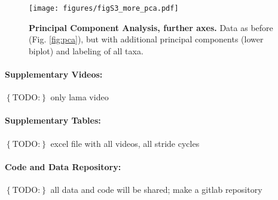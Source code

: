 \documentclass[10pt, a4paper]{article}
\newcommand{\todo}[1]{\colorbox{terracotta!30!yellow}{\footnotesize{$\left\lbrace\text{TODO:}\right\rbrace$ }#1\normalsize}}
\begin{document}
\begin{figure}[pt]
\texttt{[image: figures/figS3\_more\_pca.pdf]}
\caption[Further PC Axes]{\textbf{Principal Component Analysis, further axes.} Data as before (Fig. \ref{fig:pca}), but with additional principal components (lower biplot) and labeling of all taxa.
 }
\label{fig:more_pca}
\end{figure}



\paragraph{Supplementary Videos:} \todo{only lama video} %

\paragraph{Supplementary Tables:} \todo{excel file with all videos, all stride cycles}

\paragraph{Code and Data Repository:} \todo{all data and code will be shared; make a gitlab repository}

\end{document}
